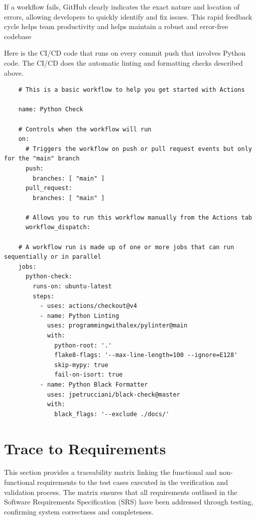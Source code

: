 \documentclass[12pt, titlepage]{article}
\begin{document}
If a workflow fails, GitHub clearly indicates the exact nature and location of errors, allowing developers to quickly identify and fix issues. This rapid feedback cycle helps team productivity and helps maintain a robust and error-free codebase

Here is the CI/CD code that runs on every commit push that involves Python code. The CI/CD does the automatic linting and formatting checks described above.
\begin{scriptsize}
    \begin{verbatim}
    # This is a basic workflow to help you get started with Actions
    
    name: Python Check
    
    # Controls when the workflow will run
    on:
      # Triggers the workflow on push or pull request events but only for the "main" branch
      push:
        branches: [ "main" ]
      pull_request:
        branches: [ "main" ]
    
      # Allows you to run this workflow manually from the Actions tab
      workflow_dispatch:
    
    # A workflow run is made up of one or more jobs that can run sequentially or in parallel
    jobs:
      python-check:
        runs-on: ubuntu-latest
        steps:
          - uses: actions/checkout@v4
          - name: Python Linting
            uses: programmingwithalex/pylinter@main
            with:
              python-root: '.'
              flake8-flags: '--max-line-length=100 --ignore=E128'
              skip-mypy: true
              fail-on-isort: true
          - name: Python Black Formatter
            uses: jpetrucciani/black-check@master
            with:
              black_flags: '--exclude ./docs/'
    \end{verbatim}
\end{scriptsize}

		
\section{Trace to Requirements}

This section provides a traceability matrix linking the functional and non-functional requirements to the test cases executed in the verification and validation process. The matrix ensures that all requirements outlined in the Software Requirements Specification (SRS) have been addressed through testing, confirming system correctness and completeness.
\end{document}

